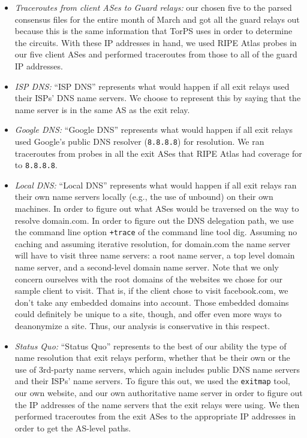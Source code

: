 \begin{itemize}
    \item \emph{Traceroutes from client ASes to Guard relays:} our chosen five to the parsed
consensus files for the entire month of March and got all the guard relays out because this is 
the same information that TorPS uses in order to determine the circuits.  With these IP addresses 
in hand, we used RIPE Atlas probes in our five client ASes and performed traceroutes from those 
to all of the guard IP addresses.

    \item \emph{ISP DNS:} ``ISP DNS'' represents what would happen if all exit relays used their ISPs' DNS name 
servers.  We choose to represent this by saying that the name server is in the same AS as the 
exit relay.

    \item \emph{Google DNS:} ``Google DNS'' represents what would happen if all exit relays used 
Google's public DNS resolver ({\tt 8.8.8.8}) for resolution. We ran traceroutes from probes in all the exit 
ASes that RIPE Atlas had coverage for to  {\tt 8.8.8.8}.

    \item \emph{Local DNS:} ``Local DNS'' represents what would happen if all exit relays ran their own name 
servers locally (e.g., the use of unbound) on their own machines. In order to figure out 
what ASes would be traversed on the way to resolve domain.com. In order to figure out the 
DNS delegation path, we use the command line option \texttt{+trace} of the
command line tool dig. Assuming no caching and assuming 
iterative resolution, for domain.com the name server will have to visit three name servers:
a root name server, a top level domain name server, and a second-level domain name server. 
Note that we only concern ourselves with the root domains of the websites we chose for our 
sample client to visit.  That is, if the client chose to visit facebook.com, we don't 
take any embedded domains into account.  Those embedded domains could definitely be unique 
to a site, though, and offer even more ways to deanonymize a site.  
Thus, our analysis is conservative in this respect.

    \item \emph{Status Quo:} ``Status Quo'' represents to the best of our ability the 
type of name resolution 
that exit relays perform, whether that be their own or the use of 3rd-party name servers, 
which again includes public DNS name servers and their ISPs' name servers.  To figure this 
out, we used the {\tt exitmap} tool, our own website, and our own authoritative name server 
in order to figure out the IP addresses of the name servers that the exit relays were 
using. We then performed traceroutes from the exit ASes to the appropriate IP addresses 
in order to get the AS-level paths.
\end{itemize}


